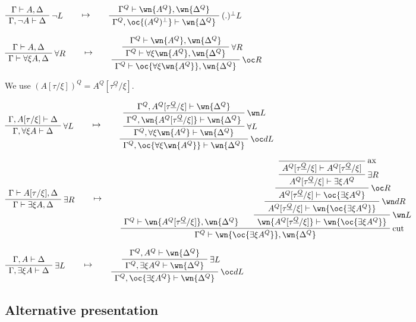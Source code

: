 \(\AxRule{\Gamma\vdash A,\Delta}
\LabelRule{\neg L}
\UnaRule{\Gamma,\neg A\vdash \Delta}
\DisplayProof
\qquad\mapsto\qquad
\AxRule{\Gamma^Q\vdash \wn{A^Q},\wn{\Delta^Q}}
\LabelRule{(.)\orth L}
\UnaRule{\Gamma^Q,\oc{(A^Q)\orth}\vdash \wn{\Delta^Q}}
\DisplayProof\)

\(\AxRule{\Gamma\vdash A,\Delta}
\LabelRule{\forall R}
\UnaRule{\Gamma\vdash \forall\xi A,\Delta}
\DisplayProof
\qquad\mapsto\qquad
\AxRule{\Gamma^Q\vdash \wn{A^Q},\wn{\Delta^Q}}
\LabelRule{\forall R}
\UnaRule{\Gamma^Q\vdash \forall\xi \wn{A^Q},\wn{\Delta^Q}}
\LabelRule{\oc R}
\UnaRule{\Gamma^Q\vdash \oc{\forall\xi \wn{A^Q}},\wn{\Delta^Q}}
\DisplayProof\)

We use \((A[\tau/\xi])^Q=A^Q[\tau^{\underline{Q}}/\xi]\).

\(\AxRule{\Gamma,A[\tau/\xi]\vdash \Delta}
\LabelRule{\forall L}
\UnaRule{\Gamma,\forall\xi A\vdash \Delta}
\DisplayProof
\qquad\mapsto\qquad
\AxRule{\Gamma^Q,A^Q[\tau^{\underline{Q}}/\xi]\vdash \wn{\Delta^Q}}
\LabelRule{\wn L}
\UnaRule{\Gamma^Q,\wn{A^Q[\tau^{\underline{Q}}/\xi]}\vdash \wn{\Delta^Q}}
\LabelRule{\forall L}
\UnaRule{\Gamma^Q,\forall\xi \wn{A^Q}\vdash \wn{\Delta^Q}}
\LabelRule{\oc d L}
\UnaRule{\Gamma^Q,\oc{\forall\xi \wn{A^Q}}\vdash \wn{\Delta^Q}}
\DisplayProof\)

\(\AxRule{\Gamma\vdash A[\tau/\xi],\Delta}
\LabelRule{\exists R}
\UnaRule{\Gamma\vdash \exists\xi A,\Delta}
\DisplayProof
\qquad\mapsto\qquad
\AxRule{\Gamma^Q\vdash \wn{A^Q[\tau^{\underline{Q}}/\xi]},\wn{\Delta^Q}}
\LabelRule{\rulename{ax}}
\NulRule{A^Q[\tau^{\underline{Q}}/\xi]\vdash A^Q[\tau^{\underline{Q}}/\xi]}
\LabelRule{\exists R}
\UnaRule{A^Q[\tau^{\underline{Q}}/\xi]\vdash \exists\xi A^Q}
\LabelRule{\oc R}
\UnaRule{A^Q[\tau^{\underline{Q}}/\xi]\vdash \oc{\exists\xi A^Q}}
\LabelRule{\wn d R}
\UnaRule{A^Q[\tau^{\underline{Q}}/\xi]\vdash \wn{\oc{\exists\xi A^Q}}}
\LabelRule{\wn L}
\UnaRule{\wn{A^Q[\tau^{\underline{Q}}/\xi]}\vdash \wn{\oc{\exists\xi A^Q}}}
\LabelRule{\rulename{cut}}
\BinRule{\Gamma^Q\vdash \wn{\oc{\exists\xi A^Q}},\wn{\Delta^Q}}
\DisplayProof\)

\(\AxRule{\Gamma,A\vdash \Delta}
\LabelRule{\exists L}
\UnaRule{\Gamma,\exists\xi A\vdash \Delta}
\DisplayProof
\qquad\mapsto\qquad
\AxRule{\Gamma^Q,A^Q\vdash \wn{\Delta^Q}}
\LabelRule{\exists L}
\UnaRule{\Gamma^Q,\exists\xi A^Q\vdash \wn{\Delta^Q}}
\LabelRule{\oc d L}
\UnaRule{\Gamma^Q,\oc{\exists\xi A^Q}\vdash \wn{\Delta^Q}}
\DisplayProof\)

\subsection{Alternative presentation}\label{alternative-presentation-1}

